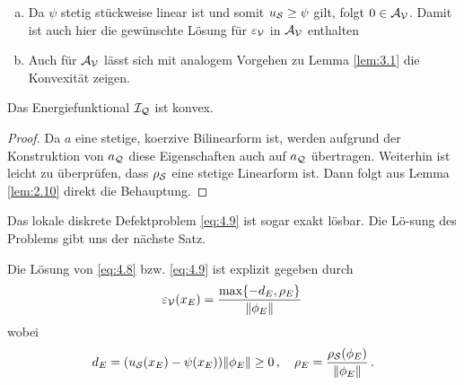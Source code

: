 \begin{bem}\label{bem:4.9}
\begin{enumerate}[(a)]
\item Da $\psi$ stetig stückweise linear ist und somit $u_{\mathcal S} \ge \psi$ gilt, folgt $0 \in \mathcal A_{\mathcal V}$. Damit ist auch hier die gewünschte Lösung für $\varepsilon_{\mathcal V}$ in $\mathcal A_{\mathcal V}$ enthalten
\item	Auch für $\mathcal A_{\mathcal V}$ lässt sich mit analogem Vorgehen zu Lemma \ref{lem:3.1} die Konvexität zeigen.
\end{enumerate}
\end{bem}


\begin{lemma}\label{lem:4.10}
Das Energiefunktional $\mathcal I_{\mathcal Q}$ ist konvex.
\end{lemma}

\begin{proof}
Da $a$ eine stetige, koerzive Bilinearform ist, werden aufgrund der Konstruktion von $a_{\mathcal Q}$ diese Eigenschaften auch auf $a_{\mathcal Q}$ übertragen. Weiterhin ist leicht zu überprüfen, dass $\rho_{\mathcal S}$ eine stetige Linearform ist. Dann folgt aus Lemma \ref{lem:2.10} direkt die Behauptung.
\end{proof}


Das lokale diskrete Defektproblem \eqref{eq:4.9} ist sogar exakt lösbar. Die Lö-sung des Problems gibt uns der nächste Satz.


\begin{satz}\label{satz:4.11}
Die Lösung von \eqref{eq:4.8} bzw. \eqref{eq:4.9} ist explizit gegeben durch
\begin{align}\label{eq:4.10}
	\varepsilon_{\mathcal V} (x_E) = \frac{\max \{-d_E,\rho_E\}}{\lVert \phi_E\rVert} \, 
\end{align}
wobei
\begin{align}\label{eq:4.11}
	d_E = (u_{\mathcal S}(x_E) - \psi (x_E))\lVert \phi_E\rVert \ge 0 \, , \quad \rho_E = \frac{\rho_{\mathcal S}(\phi_E)}{\lVert \phi_E\rVert} \, .
\end{align}
\end{satz}

